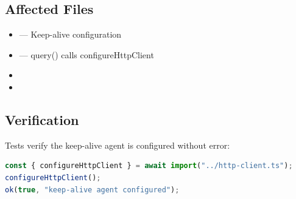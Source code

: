 \subsection*{Affected Files}
\begin{itemize}
    \item {} — Keep-alive configuration
    \item {} — query() calls configureHttpClient
    \item {}
    \item {}
\end{itemize}

\subsection*{Verification}
Tests verify the keep-alive agent is configured without error:

\begin{lstlisting}[language=TypeScript]
const { configureHttpClient } = await import("../http-client.ts");
configureHttpClient();
ok(true, "keep-alive agent configured");
\end{lstlisting}
